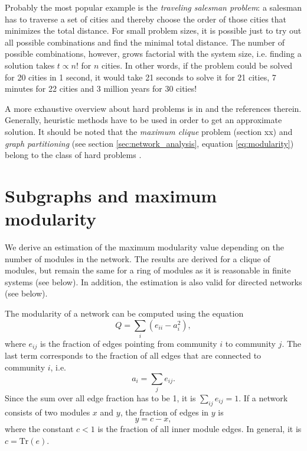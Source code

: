 Probably the most popular example is the \emph{traveling salesman problem}: a salesman has to traverse a set of cities and thereby choose the order of those cities that minimizes the total distance.
For small problem sizes, it is possible just to try out all possible combinations and find the minimal total distance.
The number of possible combinations, however, grows factorial with the system size, i.e. finding a solution takes $t\propto n!$ for $n$ cities.
In other words, if the problem could be solved for 20 cities in 1 second, it would take 21 seconds to solve it for 21 cities, 7 minutes for 22 cities and 3 million years for 30 cities!

A more exhaustive overview about hard problems is in \citep{algorithm_design} and the references therein.
Generally, heuristic methods have to be used in order to get an approximate solution.
It should be noted that the \emph{maximum clique} problem (section xx) and \emph{graph partitioning} (see section \ref{sec:network_analysis}, equation \eqref{eq:modularity}) belong to the class of hard problems \citep{brandes2007}.

\section{Subgraphs and maximum modularity}\label{sec:maximum_modularity_subgraphs}
We derive an estimation of the maximum modularity value depending on the number of modules in the network.
The results are derived for a clique of modules, but remain the same for a ring of modules as it is reasonable in finite systems (see below).
In addition, the estimation is also valid for directed networks (see below).

The modularity of a network can be computed using the equation
\begin{equation}\label{eq:mod_undir}
Q=\sum _i \left( e_{ii}-a_i^2 \right),
\end{equation}
where $e_{ij}$ is the fraction of edges pointing from community $i$ to community $j$.
The last term corresponds to the fraction of all edges that are connected to community $i$, i.e.
\[
a_i = \sum _j e_{ij}.
\]
Since the sum over all edge fraction has to be 1, it is $\sum _{ij}e_{ij}=1$.
If a network consists of two modules $x$ and $y$, the fraction of edges in $y$ is
\begin{equation}\label{qmaxbedingung}
y=c-x,
\end{equation}
where the constant $c<1$ is the fraction of all inner module edges.
In general, it is $c=\mathrm{Tr} (e)$.

